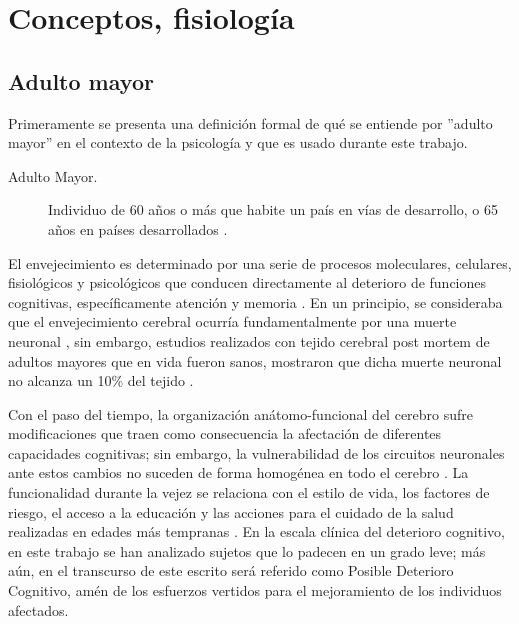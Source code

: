 
\section{Conceptos, fisiolog\'ia}

\subsection{Adulto mayor}

Primeramente se presenta una definici\'on formal de qu\'e se entiende por ''adulto mayor'' en el 
contexto de la psicolog\'ia y que es usado durante este trabajo.

\begin{description}
\item[Adulto Mayor.] Individuo de 60 a\~nos o m\'as que habite un pa\'is en v\'ias de desarrollo, o 
65 a\~nos en pa\'ises desarrollados \cite{Hita14}.
\end{description}

El envejecimiento es determinado por una serie de procesos moleculares, celulares, fisiol\'ogicos y 
psicol\'ogicos que conducen directamente al deterioro de funciones cognitivas, espec\'ificamente 
atenci\'on y memoria \cite{Navarrete03,Park09}. 
En un principio, se consideraba que el envejecimiento cerebral ocurr\'ia fundamentalmente por una 
muerte neuronal \cite{Coleman87}, sin embargo, estudios realizados con tejido cerebral post mortem 
de adultos mayores que en vida fueron sanos, mostraron que dicha muerte neuronal no alcanza un 10\% 
del tejido \cite{Esiri07}. 

Con el paso del tiempo, la organizaci\'on an\'atomo-funcional del cerebro sufre modificaciones que 
traen como consecuencia la afectaci\'on de diferentes capacidades cognitivas; sin embargo, la 
vulnerabilidad de los circuitos neuronales ante estos cambios no suceden de forma homog\'enea en 
todo el cerebro \cite{Hita14}.
La funcionalidad durante la vejez se relaciona con el estilo de vida, los factores de riesgo, el 
acceso a la educaci\'on y las acciones para el cuidado de la salud realizadas en edades m\'as 
tempranas \cite{Ohayon04,Sanhueza14}.
En la escala cl\'inica del deterioro cognitivo, en este trabajo se han analizado sujetos que lo
padecen en un grado leve; m\'as a\'un, en el transcurso de este escrito ser\'a referido como 
Posible Deterioro Cognitivo, am\'en de los esfuerzos vertidos para el mejoramiento de los 
individuos afectados.

